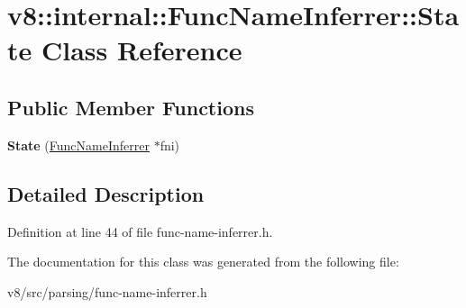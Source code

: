 \hypertarget{classv8_1_1internal_1_1FuncNameInferrer_1_1State}{}\section{v8\+:\+:internal\+:\+:Func\+Name\+Inferrer\+:\+:State Class Reference}
\label{classv8_1_1internal_1_1FuncNameInferrer_1_1State}
\subsection*{Public Member Functions}
\begin{DoxyCompactItemize}
\item 
\mbox{\label{classv8_1_1internal_1_1FuncNameInferrer_1_1State_ac12d14d123fcc1b29f276b52337d6b53}} 
{\bfseries State} (\mbox{\hyperlink{classv8_1_1internal_1_1FuncNameInferrer}{Func\+Name\+Inferrer}} $\ast$fni)
\end{DoxyCompactItemize}


\subsection{Detailed Description}


Definition at line 44 of file func-\/name-\/inferrer.\+h.



The documentation for this class was generated from the following file\+:\begin{DoxyCompactItemize}
\item 
v8/src/parsing/func-\/name-\/inferrer.\+h\end{DoxyCompactItemize}

